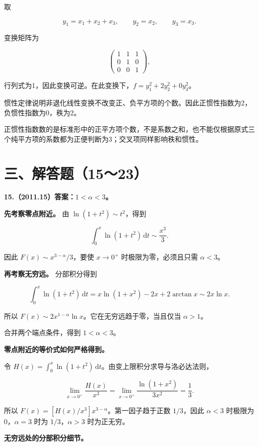 \documentclass[UTF8,11pt,fontset=windows]{ctexart}
\begin{document}
取

$$
y_1=x_1+x_2+x_3,\qquad y_2=x_2,\qquad y_3=x_3.
$$

变换矩阵为

$$
\begin{pmatrix}1&1&1\\0&1&0\\0&0&1\end{pmatrix},
$$

行列式为1，因此变换可逆。在此变换下，$f=y_1^2+2y_2^2+0y_3^2$。

惯性定律说明非退化线性变换不改变正、负平方项的个数。因此正惯性指数为2，负惯性指数为0，秩为2。

正惯性指数数的是标准形中的正平方项个数，不是系数之和，也不能仅根据原式三个纯平方项的系数都为正便判断为3；交叉项同样影响秩和惯性。

\clearpage

\section*{三、解答题（15～23）}

\textbf{15.（2011.15）答案：$1<\alpha<3$。}

\textbf{先考察零点附近。} 由 $\ln(1+t^2)\sim t^2$，得到

$$
\int_0^x\ln(1+t^2)\,\mathrm dt\sim\frac{x^3}{3}.
$$

因此 $F(x)\sim x^{3-\alpha}/3$，要使 $x\to0^+$ 时极限为零，必须且只需 $\alpha<3$。

\textbf{再考察无穷远。} 分部积分得到

$$
\int_0^x\ln(1+t^2)\,\mathrm dt
=x\ln(1+x^2)-2x+2\arctan x\sim2x\ln x.
$$

所以 $F(x)\sim2x^{1-\alpha}\ln x$。它在无穷远趋于零，当且仅当 $\alpha>1$。

合并两个端点条件，得到 $1<\alpha<3$。

\textbf{零点附近的等价式如何严格得到。}

令 $H(x)=\int_0^x\ln(1+t^2)\,\mathrm dt$。由变上限积分求导与洛必达法则，

$$
\lim_{x\to0^+}\frac{H(x)}{x^3}
=\lim_{x\to0^+}\frac{\ln(1+x^2)}{3x^2}=\frac13.
$$

所以 $F(x)=[H(x)/x^3]x^{3-\alpha}$。第一因子趋于正数 $1/3$，因此 $\alpha<3$ 时极限为0，$\alpha=3$ 时为 $1/3$，$\alpha>3$ 时为正无穷。

\textbf{无穷远处的分部积分细节。}
\end{document}
